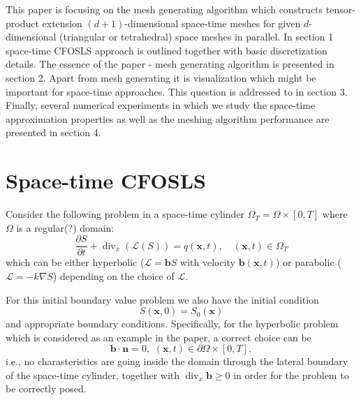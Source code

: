 \documentclass[12pt]{article}
\begin{document}
This paper is focusing on the mesh generating algorithm which constructs tensor-product extension $(d+1)$-dimensional space-time meshes for given $d$-dimensional  (triangular or tetrahedral) space meshes in parallel. In section 1 space-time CFOSLS approach is outlined together with basic discretization details. The essence of the paper - mesh generating algorithm is presented in section 2. Apart from mesh generating it is visualization which might be important for space-time approaches. This question is addressed to in section 3. Finally, several numerical experiments in which we study the space-time approximation properties as well as the meshing algorithm performance are presented in section 4.

\section{Space-time CFOSLS}
Consider the following problem in a space-time cylinder $\Omega_T = \Omega \times [0, T]$ where $
\Omega$ is a regular(?) domain:
$$
\frac{\partial S}{\partial t} + \operatorname{div}_x \left( \mathcal{L}(S) \right) = q(\mathbf{x}, t), \quad (\mathbf{x},t) \in \Omega_T
$$
which can be either hyperbolic ($\mathcal{L} = \mathbf{b} S$ with velocity $\mathbf{b}(\mathbf{x}, t)$) or parabolic ($\mathcal{L} = - k \nabla S$) depending on the choice of $\mathcal{L}$.

For this initial boundary value problem we also have the initial condition
$$
S(\mathbf{x},0) = S_0(\mathbf{x})
$$
and appropriate boundary conditions. Specifically, for the hyperbolic problem which is considered as an example in the paper, a correct choice can be
$$
\mathbf{b} \cdot \mathbf{n} = 0, \, \, (\mathbf{x},t) \in \partial \Omega \times [0,T],
$$
i.e., no charasteristics are going inside the domain through the lateral boundary of the space-time cylinder,
together with $\operatorname{div}_{x} \mathbf{b} \geq 0$ in order for the problem to be correctly posed.
\end{document}
